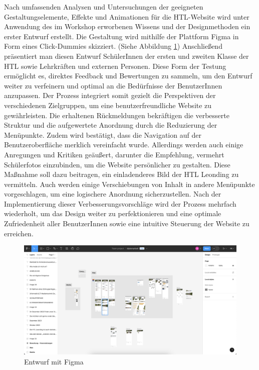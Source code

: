 Nach umfassenden Analysen und Untersuchungen der geeigneten Gestaltungselemente, Effekte und Animationen für die HTL-Website wird unter Anwendung des im Workshop 
erworbenen Wissens und der Designmethoden ein erster Entwurf erstellt. Die Gestaltung wird mithilfe der Plattform Figma in Form eines 
Click-Dummies skizziert. (Siehe Abbildung \ref{fig:impl:figma_entwurf}) Anschließend präsentiert man diesen Entwurf SchülerInnen der ersten und zweiten Klasse der HTL sowie Lehrkräften 
und externen Personen. Diese Form der Testung ermöglicht es, direktes Feedback und Bewertungen zu sammeln, um den Entwurf 
weiter zu verfeinern und optimal an die Bedürfnisse der BenutzerInnen anzupassen. Der Prozess integriert somit gezielt die Perspektiven 
der verschiedenen Zielgruppen, um eine benutzerfreundliche Website zu gewährleisten. 
Die erhaltenen Rückmeldungen bekräftigen die verbesserte Struktur und die aufgewertete Anordnung durch die Reduzierung der Menüpunkte. 
Zudem wird bestätigt, dass die Navigation auf der Benutzeroberfläche merklich vereinfacht wurde. Allerdings werden auch einige Anregungen 
und Kritiken geäußert, darunter die Empfehlung, vermehrt Schülerfotos einzubinden, um die Website persönlicher zu gestalten. Diese Maßnahme 
soll dazu beitragen, ein einladenderes Bild der HTL Leonding zu vermitteln. Auch werden einige Verschiebungen von Inhalt in andere Menüpunkte 
vorgeschlagen, um eine logischere Anordnung sicherzustellen. 
Nach der Implementierung dieser Verbesserungsvorschläge wird der Prozess mehrfach wiederholt, um das Design weiter zu perfektionieren und 
eine optimale Zufriedenheit aller BenutzerInnen sowie eine intuitive Steuerung der Website zu erreichen. 

\begin{figure}
   \begin{minipage}[b]{\linewidth} 
      \includegraphics[width=\linewidth]{pics/figma.png}
      \caption{Entwurf mit Figma}
      \label{fig:impl:figma_entwurf}
   \end{minipage}
   \hspace{.05\linewidth}
\end{figure}

